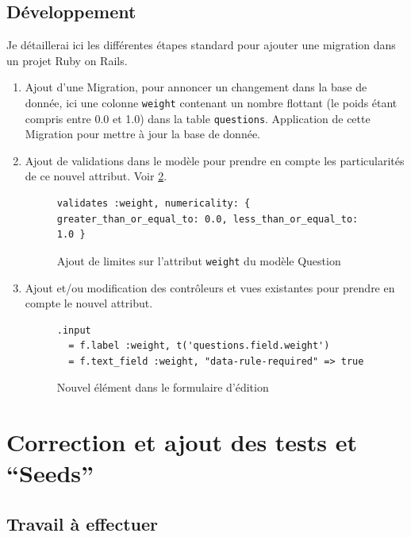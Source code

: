 \documentclass[12pt,a4paper]{book}
\begin{document}
\subsection{Développement}

Je détaillerai ici les différentes étapes standard pour ajouter une migration dans un projet Ruby on Rails.

\begin{enumerate}
  \item Ajout d'une Migration, pour annoncer un changement dans la base de donnée, ici une colonne \texttt{weight} contenant un nombre flottant (le poids étant compris entre 0.0 et 1.0) dans la table \texttt{questions}. Application de cette Migration pour mettre à jour la base de donnée.
  \item Ajout de validations dans le modèle pour prendre en compte les particularités de ce nouvel attribut. Voir \cref{fig.weight_validation}.
  
  \begin{figure}[h]
  \lstset{language=ruby}
  \begin{lstlisting}
validates :weight, numericality: { greater_than_or_equal_to: 0.0, less_than_or_equal_to: 1.0 }
  \end{lstlisting}
   \caption{Ajout de limites sur l'attribut \texttt{weight} du modèle Question}
  \label{fig.weight_validation}
  \end{figure}
  \item Ajout et/ou modification des contrôleurs et vues existantes pour prendre en compte le nouvel attribut.

  \begin{figure}[h]
  \lstset{language=ruby}
  \begin{lstlisting}
.input
  = f.label :weight, t('questions.field.weight')
  = f.text_field :weight, "data-rule-required" => true
  \end{lstlisting}
   \caption{Nouvel élément dans le formulaire d'édition}
  \label{fig.weight_validation}
  \end{figure}
  
\end{enumerate}

\section{Correction et ajout des tests et ``Seeds''}

\label{section.tests_seeds_dev}

\subsection{Travail à effectuer}
\end{document}
